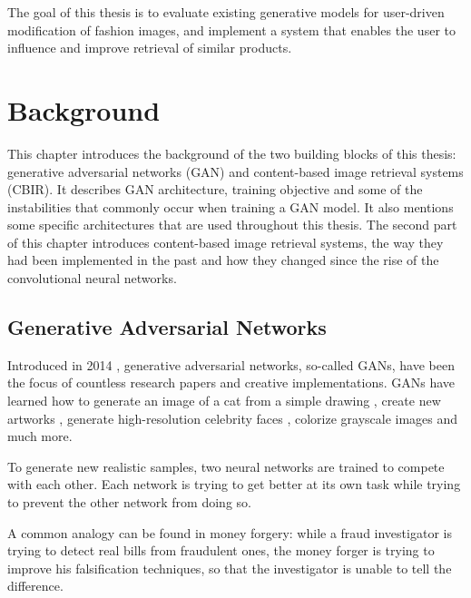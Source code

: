 \documentclass[12pt]{report}
\begin{document}
The goal of this thesis is to evaluate existing generative models for user-driven modification of fashion images, and implement a system that enables the user to influence and improve retrieval of similar products.

\newpage
\chapter{Background}
This chapter introduces the background of the two building blocks of this thesis: generative adversarial networks (GAN) and content-based image retrieval systems (CBIR). It describes GAN architecture, training objective and some of the instabilities that commonly occur when training a GAN model. It also mentions some specific architectures that are used throughout this thesis. The second part of this chapter introduces content-based image retrieval systems, the way they had been implemented in the past and how they changed since the rise of the convolutional neural networks.

\pagebreak
\section{Generative Adversarial Networks}

Introduced in 2014 \cite{goodfellow_generative_2014}, generative adversarial  networks, so-called GANs, have been the focus of countless research papers and creative implementations. GANs have learned how to generate an image of a cat from a simple drawing \cite{hesse_image--image_nodate}, create new artworks \cite{rkjones4_gangogh_2018}, generate high-resolution celebrity faces \cite{karras_progressive_2017}, colorize grayscale images and much more.

To generate new realistic samples, two neural networks are trained to compete with each other. Each network is trying to get better at its own task while trying to prevent the other network from doing so. 

A common analogy can be found in money forgery: while a fraud investigator is trying to detect real bills from fraudulent ones, the money forger is trying to improve his falsification techniques, so that the investigator is unable to tell the difference.
\end{document}
